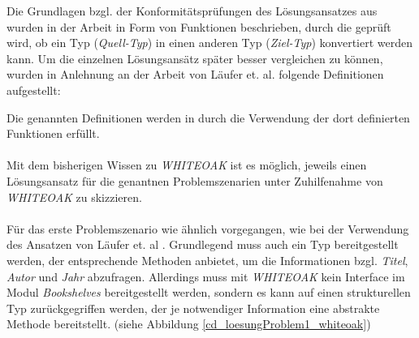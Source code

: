 \documentclass[11pt, 
ngerman,
doublespacing,
chapterinoneline, %
consistentlayout, %
]{scrartcl}
\begin{document}
Die Grundlagen bzgl. der Konformitätsprüfungen des Lösungsansatzes aus \cite{whiteoak} wurden in der Arbeit in Form von Funktionen beschrieben, durch die geprüft wird, ob ein Typ (\emph{Quell-Typ}) in einen anderen Typ (\emph{Ziel-Typ}) konvertiert werden kann. Um die einzelnen Lösungsansätz später besser vergleichen zu können, wurden in Anlehnung an der Arbeit von Läufer et. al. \cite{structconfjava} folgende Definitionen aufgestellt:


Die genannten Definitionen werden in \cite{whiteoak} durch die Verwendung der dort definierten Funktionen erfüllt.\\\\



Mit dem bisherigen Wissen zu \emph{WHITEOAK} ist es möglich, jeweils einen Lösungsansatz für die genantnen Problemszenarien unter Zuhilfenahme von \emph{WHITEOAK} zu skizzieren.\\\\
Für das erste Problemszenario wie ähnlich vorgegangen, wie bei der Verwendung des Ansatzen von Läufer et. al \cite{structconfjava}. Grundlegend muss auch ein Typ bereitgestellt werden, der entsprechende Methoden anbietet, um die Informationen bzgl. \emph{Titel}, \emph{Autor} und \emph{Jahr} abzufragen. 
Allerdings muss mit \emph{WHITEOAK} kein Interface im Modul \emph{Bookshelves} bereitgestellt werden, sondern es kann auf einen strukturellen Typ zurückgegriffen werden, der je notwendiger Information eine abstrakte Methode bereitstellt. (siehe Abbildung \ref{cd_loesungProblem1_whiteoak})
\end{document}
